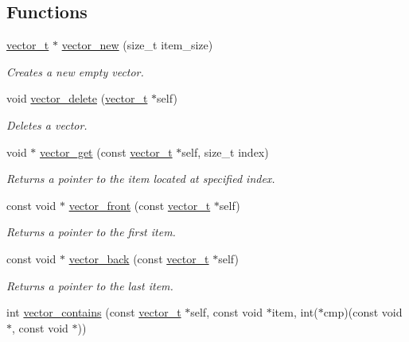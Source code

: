 \subsection*{\-Functions}
\begin{DoxyCompactItemize}
\item 
\hyperlink{structvector__t}{vector\-\_\-t} $\ast$ \hyperlink{group__vector_ga9ab13f896bb29debbbf8175e75751ea5}{vector\-\_\-new} (size\-\_\-t item\-\_\-size)
\begin{DoxyCompactList}\small\item\em \-Creates a new empty vector. \end{DoxyCompactList}\item 
void \hyperlink{group__vector_gae045e222efa8898716f8322c5667f624}{vector\-\_\-delete} (\hyperlink{structvector__t}{vector\-\_\-t} $\ast$self)
\begin{DoxyCompactList}\small\item\em \-Deletes a vector. \end{DoxyCompactList}\item 
void $\ast$ \hyperlink{group__vector_gaaf3cd27681da5219d235604b64a278e4}{vector\-\_\-get} (const \hyperlink{structvector__t}{vector\-\_\-t} $\ast$self, size\-\_\-t index)
\begin{DoxyCompactList}\small\item\em \-Returns a pointer to the item located at specified index. \end{DoxyCompactList}\item 
const void $\ast$ \hyperlink{group__vector_ga89ea189955bd6c4873aca8288c96ad1b}{vector\-\_\-front} (const \hyperlink{structvector__t}{vector\-\_\-t} $\ast$self)
\begin{DoxyCompactList}\small\item\em \-Returns a pointer to the first item. \end{DoxyCompactList}\item 
const void $\ast$ \hyperlink{group__vector_ga1b74708d66280dbf5865bb51e8f5c394}{vector\-\_\-back} (const \hyperlink{structvector__t}{vector\-\_\-t} $\ast$self)
\begin{DoxyCompactList}\small\item\em \-Returns a pointer to the last item. \end{DoxyCompactList}\item 
int \hyperlink{group__vector_ga3449b56bc57599ceca39ee5960057ac4}{vector\-\_\-contains} (const \hyperlink{structvector__t}{vector\-\_\-t} $\ast$self, const void $\ast$item, int($\ast$cmp)(const void $\ast$, const void $\ast$))

\end{DoxyCompactItemize}
